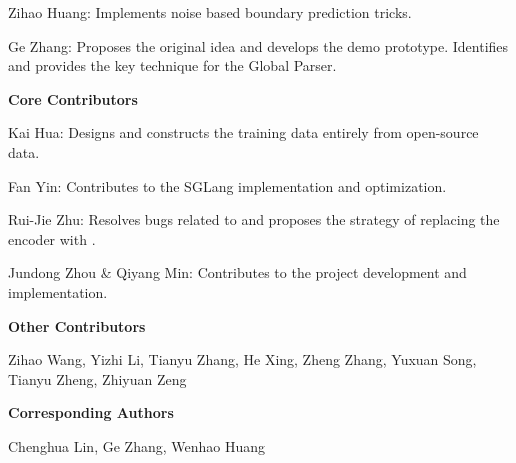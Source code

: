 Zihao Huang: Implements noise based boundary prediction tricks.

Ge Zhang: Proposes the original idea and develops the demo prototype. Identifies and provides the key technique for the Global Parser.

\textbf{Core Contributors}

Kai Hua: Designs and constructs the training data entirely from open-source data.

Fan Yin: Contributes to the SGLang implementation and optimization.

Rui-Jie Zhu: Resolves bugs related to \ModelName{} and proposes the strategy of replacing the encoder with \ModelName{}.

Jundong Zhou \& Qiyang Min: Contributes to the project development and implementation.

\textbf{Other Contributors}

Zihao Wang, Yizhi Li, Tianyu Zhang, He Xing, Zheng Zhang, Yuxuan Song, Tianyu Zheng, Zhiyuan Zeng

\textbf{Corresponding Authors}

Chenghua Lin, Ge Zhang, Wenhao Huang